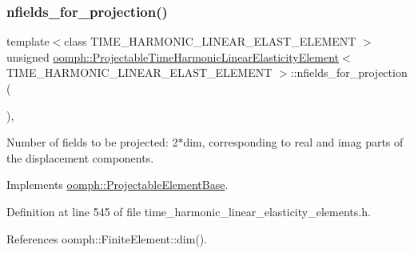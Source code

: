 \subsubsection{\texorpdfstring{nfields\+\_\+for\+\_\+projection()}{nfields\_for\_projection()}}
{\footnotesize\ttfamily template$<$class T\+I\+M\+E\+\_\+\+H\+A\+R\+M\+O\+N\+I\+C\+\_\+\+L\+I\+N\+E\+A\+R\+\_\+\+E\+L\+A\+S\+T\+\_\+\+E\+L\+E\+M\+E\+NT $>$ \\
unsigned \hyperlink{classoomph_1_1ProjectableTimeHarmonicLinearElasticityElement}{oomph\+::\+Projectable\+Time\+Harmonic\+Linear\+Elasticity\+Element}$<$ T\+I\+M\+E\+\_\+\+H\+A\+R\+M\+O\+N\+I\+C\+\_\+\+L\+I\+N\+E\+A\+R\+\_\+\+E\+L\+A\+S\+T\+\_\+\+E\+L\+E\+M\+E\+NT $>$\+::nfields\+\_\+for\+\_\+projection (\begin{DoxyParamCaption}{ }\end{DoxyParamCaption})\hspace{0.3cm}{\ttfamily [inline]}, {\ttfamily [virtual]}}



Number of fields to be projected\+: 2$\ast$dim, corresponding to real and imag parts of the displacement components. 



Implements \hyperlink{classoomph_1_1ProjectableElementBase_a44634aa4049332a580d249c25564638c}{oomph\+::\+Projectable\+Element\+Base}.



Definition at line 545 of file time\+\_\+harmonic\+\_\+linear\+\_\+elasticity\+\_\+elements.\+h.



References oomph\+::\+Finite\+Element\+::dim().

\mbox{\label{classoomph_1_1ProjectableTimeHarmonicLinearElasticityElement_a5d6d66a33214a0aff4e661fca8350a83}} 
